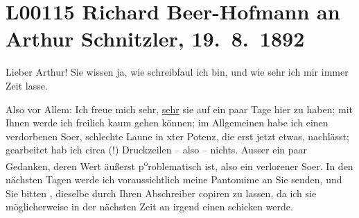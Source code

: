 

\section[Richard Beer-Hofmann an Arthur Schnitzler, 19. 8. 1892]{L00115 Richard Beer-Hofmann an Arthur Schnitzler, 19. 8. 1892}
\nopagebreak{}
\rehead{ }\normalsize\beginnumbering{}
\toendnotes[C]{\smallbreak\pagebreak[2]}
\toendnotes[C]{\smallbreak}
\pstart
           \noindent{}{\pb}Lieber Arthur! Sie wissen ja, wie schreibfaul ich bin, und wie sehr
               ich mir immer Zeit lasse.\pend
           
\pstart
           Also vor Allem: Ich freue mich sehr, \uline{sehr} sie auf ein
               paar Tage hier zu haben; mit Ihnen {\pb}werde ich freilich kaum gehen können; im Allgemeinen habe ich einen verdorbenen
                  So{\geminationm}er, schlechte Laune in xter Potenz, die erst jetzt
               etwas, nachlässt; gearbeitet {\pb}hab
               ich circa  (!) Druckzeilen – also – nichts. Ausser
               ein paar Gedanken, deren Wert äußerst p\substVorne{}\textsuperscript{o}\substDazwischen{}ro\substHinten{}blematisch ist, also ein verlorener So{\geminationm}er. In
               den nächsten {\pb}Tagen werde ich
               voraussichtlich meine Pantomime an Sie senden, und Sie bitten ,
               dieselbe durch Ihren Abschreiber copiren zu lassen, da ich sie möglicherweise in der nächsten
               Zeit an irgend einen \label{K_L00115-1v}\label{K_L00115-1}{\pb} schicken werde.\pend
           

